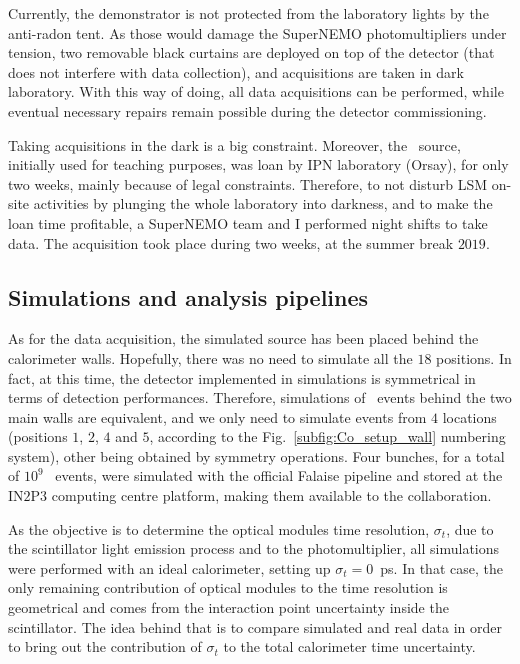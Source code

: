 Currently, the demonstrator is not protected from the laboratory lights by the anti-radon tent.
As those would damage the SuperNEMO photomultipliers under tension, two removable black curtains are deployed on top of the detector (that does not interfere with data collection), and acquisitions are taken in dark laboratory.
With this way of doing, all data acquisitions can be performed, while eventual necessary repairs remain possible during the detector commissioning.

Taking acquisitions in the dark is a big constraint.
Moreover, the \Co\ source, initially used for teaching purposes, was loan by IPN laboratory (Orsay), for only two weeks, mainly because of legal constraints.
Therefore, to not disturb LSM on-site activities by plunging the whole laboratory into darkness, and to make the loan time profitable, a SuperNEMO team and I performed night shifts to take data.
The acquisition took place during two weeks, at the summer break $2019$.

\subsection{Simulations and analysis pipelines}


As for the data acquisition, the simulated source has been placed behind the calorimeter walls.
Hopefully, there was no need to simulate all the $18$ positions.
In fact, at this time, the detector implemented in simulations is symmetrical in terms of detection performances.
Therefore, simulations of \Co\ events behind the two main walls are equivalent, and we only need to simulate events from $4$ locations (positions $1$, $2$, $4$ and $5$, according to the Fig.~\ref{subfig:Co_setup_wall} numbering system), other being obtained by symmetry operations.
Four bunches, for a total of $10^{9}$ \Co\ events, were simulated with the official Falaise pipeline and stored at the IN$2$P$3$ computing centre platform, making them available to the collaboration.

As the objective is to determine the optical modules time resolution, $\sigma_{t}$, due to the scintillator light emission process and to the photomultiplier, all simulations were performed with an ideal calorimeter, setting up ${\sigma_{t}=0}$~ps.
In that case, the only remaining contribution of optical modules to the time resolution is geometrical and comes from the interaction point uncertainty inside the scintillator.
The idea behind that is to compare simulated and real data in order to bring out the contribution of $\sigma_{t}$ to the total calorimeter time uncertainty.

